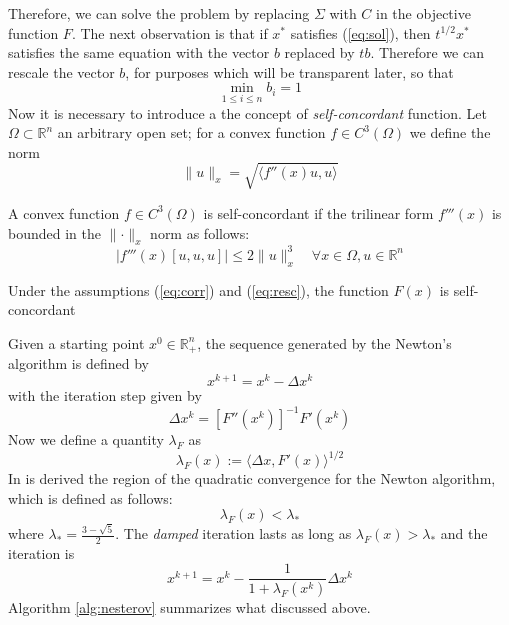 Therefore, we can solve the problem by replacing $\Sigma$ with $C$ in the objective function $F$. The next observation is that if $x^*$ satisfies (\ref{eq:sol}), then $t^{1/2}x^*$ satisfies the same equation with the vector $b$ replaced by $tb$. Therefore we can rescale the vector $b$, for purposes which will be transparent later, so that
\begin{equation}\label{eq:resc}
\min_{1 \leq i \leq n} b_i = 1
\end{equation}
Now it is necessary to introduce a the concept of \textit{self-concordant} function. Let $\Omega \subset \mathbb{R}^n$ an arbitrary open set; for a convex function $f \in C^3(\Omega)$ we define the norm 
\begin{equation}
\parallel u \parallel _x = \sqrt{\langle f''(x)u,u\rangle}
\end{equation}
\begin{definition}
A convex function $f \in C^3(\Omega)$ is self-concordant if the trilinear form $f'''(x)$ is bounded in the $\parallel \cdot \parallel _x$ norm as follows:
\begin{equation}
|f'''(x)[u,u,u]| \leq 2\parallel u \parallel_x^3 \quad \forall x \in \Omega, u \in \mathbb{R}^n
\end{equation}
\end{definition}
\begin{lemma}
Under the assumptions  (\ref{eq:corr}) and (\ref{eq:resc}), the function $F(x)$ is self-concordant
\end{lemma}
Given a starting point $x^{0} \in \mathbb{R}^n_+$, the sequence generated by the Newton's algorithm is defined by
\begin{equation}
x^{k+1} = x^{k} - \Delta x^{k}
\end{equation}
with the iteration step given by
\begin{equation}
\Delta x^{k} = [F''(x^{k})]^{-1}F'(x^{k})
\end{equation}
Now we define a quantity $\lambda_F$ as
\begin{equation}
\lambda_F(x) := \langle \Delta x, F'(x)\rangle^{1/2}
\end{equation}
In \cite{nesterov} is derived the region of the quadratic convergence for the Newton algorithm, which is defined as follows:
\begin{equation}
\lambda_F(x) < \lambda_*
\end{equation} 
where $\lambda_* = \frac{3-\sqrt{5}}{2}$. The \textit{damped} iteration lasts as long as $\lambda_F(x) > \lambda_*$ and the iteration is
\begin{equation}
x^{k+1} = x^{k} - \frac{1}{1+\lambda_F(x^{k})}\Delta x^{k}
\end{equation}
Algorithm \ref{alg:nesterov} summarizes what discussed above.

